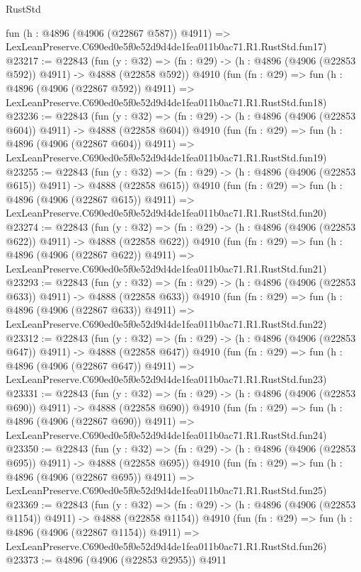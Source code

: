 \begin{lexlean}{RustStd}
\begin{coremodule}
    fun (h : @4896 (@4906 (@22867 @587)) @4911) =>
    LexLeanPreserve.C690ed0e5f0e52d9d4de1fea011b0ac71.R1.RustStd.fun17)
@23217 := @22843
    (fun (y : @32) => (fn : @29) -> (h : @4896 (@4906 (@22853 @592)) @4911) -> @4888 (@22858 @592))
    @4910
    (fun (fn : @29) =>
    fun (h : @4896 (@4906 (@22867 @592)) @4911) =>
    LexLeanPreserve.C690ed0e5f0e52d9d4de1fea011b0ac71.R1.RustStd.fun18)
@23236 := @22843
    (fun (y : @32) => (fn : @29) -> (h : @4896 (@4906 (@22853 @604)) @4911) -> @4888 (@22858 @604))
    @4910
    (fun (fn : @29) =>
    fun (h : @4896 (@4906 (@22867 @604)) @4911) =>
    LexLeanPreserve.C690ed0e5f0e52d9d4de1fea011b0ac71.R1.RustStd.fun19)
@23255 := @22843
    (fun (y : @32) => (fn : @29) -> (h : @4896 (@4906 (@22853 @615)) @4911) -> @4888 (@22858 @615))
    @4910
    (fun (fn : @29) =>
    fun (h : @4896 (@4906 (@22867 @615)) @4911) =>
    LexLeanPreserve.C690ed0e5f0e52d9d4de1fea011b0ac71.R1.RustStd.fun20)
@23274 := @22843
    (fun (y : @32) => (fn : @29) -> (h : @4896 (@4906 (@22853 @622)) @4911) -> @4888 (@22858 @622))
    @4910
    (fun (fn : @29) =>
    fun (h : @4896 (@4906 (@22867 @622)) @4911) =>
    LexLeanPreserve.C690ed0e5f0e52d9d4de1fea011b0ac71.R1.RustStd.fun21)
@23293 := @22843
    (fun (y : @32) => (fn : @29) -> (h : @4896 (@4906 (@22853 @633)) @4911) -> @4888 (@22858 @633))
    @4910
    (fun (fn : @29) =>
    fun (h : @4896 (@4906 (@22867 @633)) @4911) =>
    LexLeanPreserve.C690ed0e5f0e52d9d4de1fea011b0ac71.R1.RustStd.fun22)
@23312 := @22843
    (fun (y : @32) => (fn : @29) -> (h : @4896 (@4906 (@22853 @647)) @4911) -> @4888 (@22858 @647))
    @4910
    (fun (fn : @29) =>
    fun (h : @4896 (@4906 (@22867 @647)) @4911) =>
    LexLeanPreserve.C690ed0e5f0e52d9d4de1fea011b0ac71.R1.RustStd.fun23)
@23331 := @22843
    (fun (y : @32) => (fn : @29) -> (h : @4896 (@4906 (@22853 @690)) @4911) -> @4888 (@22858 @690))
    @4910
    (fun (fn : @29) =>
    fun (h : @4896 (@4906 (@22867 @690)) @4911) =>
    LexLeanPreserve.C690ed0e5f0e52d9d4de1fea011b0ac71.R1.RustStd.fun24)
@23350 := @22843
    (fun (y : @32) => (fn : @29) -> (h : @4896 (@4906 (@22853 @695)) @4911) -> @4888 (@22858 @695))
    @4910
    (fun (fn : @29) =>
    fun (h : @4896 (@4906 (@22867 @695)) @4911) =>
    LexLeanPreserve.C690ed0e5f0e52d9d4de1fea011b0ac71.R1.RustStd.fun25)
@23369 := @22843
    (fun (y : @32) =>
    (fn : @29) -> (h : @4896 (@4906 (@22853 @1154)) @4911) -> @4888 (@22858 @1154))
    @4910
    (fun (fn : @29) =>
    fun (h : @4896 (@4906 (@22867 @1154)) @4911) =>
    LexLeanPreserve.C690ed0e5f0e52d9d4de1fea011b0ac71.R1.RustStd.fun26)
@23373 := @4896 (@4906 (@22853 @2955)) @4911

\end{coremodule}
\end{lexlean}
